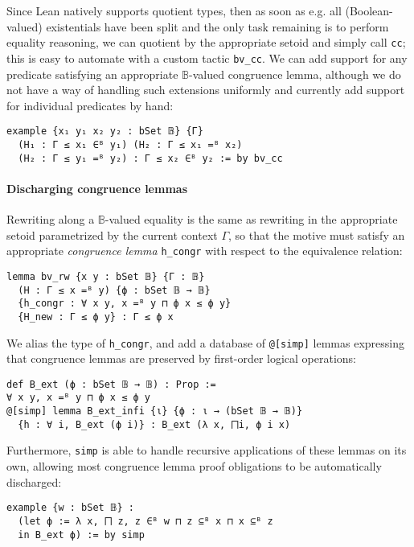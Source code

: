 \documentclass[sigplan,10pt,review, anonymous]{acmart}
\newcommand{\lil}{\lstinline}
\theoremstyle{definition}
\begin{document}
Since Lean natively supports quotient types, then as soon as e.g. all (Boolean-valued) existentials have been split and the only task remaining is to perform equality reasoning,
we can quotient by the appropriate setoid and simply call \lil{cc};
this is easy to automate with a custom tactic \lil{bv_cc}. %
We can add support for any predicate satisfying an appropriate \(\mathbb{B}\)-valued congruence lemma,
although we do not have a way of handling such extensions uniformly and currently add support for individual predicates by hand:
\begin{lstlisting}
example {x₁ y₁ x₂ y₂ : bSet 𝔹} {Γ}
  (H₁ : Γ ≤ x₁ ∈ᴮ y₁) (H₂ : Γ ≤ x₁ =ᴮ x₂)
  (H₂ : Γ ≤ y₁ =ᴮ y₂) : Γ ≤ x₂ ∈ᴮ y₂ := by bv_cc
\end{lstlisting}
\paragraph{Discharging congruence lemmas} \label{subsect:B-ext}
Rewriting along a \(\mathbb{B}\)-valued equality is the same as rewriting in the appropriate setoid parametrized by the current context \(\Gamma\), %
so that the motive must satisfy an appropriate \emph{congruence lemma} \lil{h_congr} with respect to the equivalence relation:
\begin{lstlisting}
lemma bv_rw {x y : bSet 𝔹} {Γ : 𝔹}
  (H : Γ ≤ x =ᴮ y) {ϕ : bSet 𝔹 → 𝔹}
  {h_congr : ∀ x y, x =ᴮ y ⊓ ϕ x ≤ ϕ y}
  {H_new : Γ ≤ ϕ y} : Γ ≤ ϕ x
\end{lstlisting}
We alias the type of \lil{h_congr}, and add a database of \lil{@[simp]} lemmas expressing that congruence lemmas are preserved by first-order logical operations:
\begin{lstlisting}
def B_ext (ϕ : bSet 𝔹 → 𝔹) : Prop :=
∀ x y, x =ᴮ y ⊓ ϕ x ≤ ϕ y
@[simp] lemma B_ext_infi {ι} {ϕ : ι → (bSet 𝔹 → 𝔹)}
  {h : ∀ i, B_ext (ϕ i)} : B_ext (λ x, ⨅i, ϕ i x)
\end{lstlisting}
Furthermore, \lil{simp} is able to handle recursive applications of these lemmas on its own, allowing most congruence lemma proof obligations to be automatically discharged:
\begin{lstlisting}
example {w : bSet 𝔹} :
  (let ϕ := λ x, ⨅ z, z ∈ᴮ w ⊓ z ⊆ᴮ x ⊓ x ⊆ᴮ z
  in B_ext ϕ) := by simp
\end{lstlisting}
\end{document}
